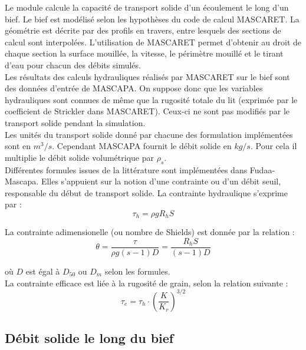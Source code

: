 \documentclass[a4paper,10pt]{article}
\begin{document}
\noindent
Le module calcule la capacit\'e de transport solide d'un \'ecoulement le long d'un bief. Le bief est mod\'elis\'e selon les hypoth\`eses du code de calcul MASCARET. La g\'eom\'etrie est d\'ecrite par des profils en travers, entre lesquels des sections de calcul sont interpol\'ees. L'utilisation de MASCARET permet d'obtenir au droit de chaque section la surface mouill\'ee, la vitesse, le p\'erim\`etre mouill\'e et le tirant d'eau pour chacun des d\'ebits simul\'es.  \\

\noindent
Les r\'esultats des calculs hydrauliques r\'ealis\'es par MASCARET sur le bief sont des donn\'ees d'entr\'ee de MASCAPA. On suppose donc que les variables hydrauliques sont connues de m\^eme que la rugosit\'e totale du lit (exprim\'ee par le coefficient de Strickler dans MASCARET). Ceux-ci ne sont pas modifi\'es par le transport solide pendant la simulation. \\

\noindent
Les unit\'es du transport solide donn\'e par chacune des formulation impl\'ement\'ees sont en $m^3/s$. Cependant MASCAPA fournit le d\'ebit solide en $kg/s$. Pour cela il multiplie le d\'ebit solide volum\'etrique par $\rho_s$. \\

\noindent
Diff\'erentes formules issues de la litt\'erature sont impl\'ement\'ees dans Fudaa-Mascapa. Elles s'appuient sur la notion d'une contrainte ou d'un d\'ebit seuil, responsable du d\'ebut de transport solide. La contrainte hydraulique s'exprime par :
$$ \tau_h = \rho g R_h S $$ 

La contrainte adimensionelle (ou nombre de Shields) est donn\'ee par la relation :
$$ \theta = \frac{\tau}{\rho g (s-1) D} = \frac{R_h S}{(s-1) D} $$

o\`u $D$ est \'egal \`a $D_{50}$ ou $D_m$ selon les formules. \\

La contrainte efficace est li\'ee \`a la rugosit\'e de grain, selon la relation suivante :
$$ \tau_{e} = \tau_h \cdot \left(\frac{K}{K_r}\right)^{3/2} $$


\subsection{D\'ebit solide le long du bief}
\end{document}

